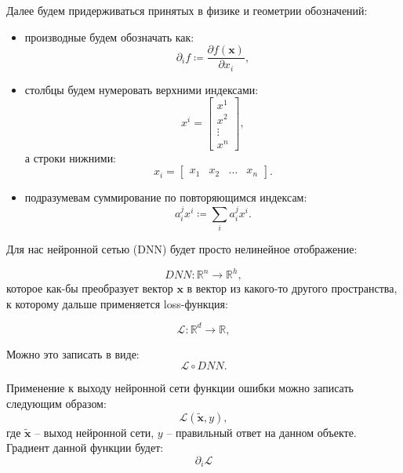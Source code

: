 \documentclass[12pt, oneside, a4paper, openany]{scrarticle}
\begin{document}
Далее будем придерживаться принятых в физике и геометрии обозначений:
\begin{itemize}
	\item производные будем обозначать как:
	\begin{equation}
		\partial_i f \coloneqq \frac{\partial f(\bm{x})}{\partial x_i},
	\end{equation}
	\item столбцы будем нумеровать верхними индексами:
	\begin{equation}
		x^i = 
		\begin{bmatrix}
    		x^1\\
    		x^2\\
    		\vdots \\
    		x^n
    	\end{bmatrix},
	\end{equation}
	а строки нижними:
	\begin{equation}
		x_i = 
		\begin{bmatrix}
    		x_1 & x_2 & \hdots & x_n
    	\end{bmatrix}.
	\end{equation}
	\item подразумевам суммирование по повторяющимся индексам:
	\begin{equation}
		a_i^j x^i \coloneqq \sum_i a_i^j x^i.
	\end{equation}
\end{itemize}

Для нас нейронной сетью (DNN) будет просто нелинейное отображение:

\begin{equation}
	DNN : \mathbb{R}^n \to \mathbb{R}^h,
\end{equation}
которое как-бы преобразует вектор $\bm{x}$ в вектор из какого-то другого пространства, к которому дальше применяется loss-функция:

\begin{equation}
	\mathscr{L} : \mathbb{R}^d \to \mathbb{R},
\end{equation}

Можно это записать в виде:
\begin{equation}
	\mathscr{L} \circ DNN.
\end{equation}


Применение к выходу нейронной сети функции ошибки можно записать следующим образом:
\begin{equation}
	\mathscr{L}(\bm{\tilde{x}}, y),
\end{equation}
где $\bm{\tilde{x}}$ -- выход нейронной сети, $y$ -- правильный ответ на данном объекте. Градиент данной функции будет:
\begin{equation}
	\partial_i\mathscr{L}
\end{equation}
\end{document}
